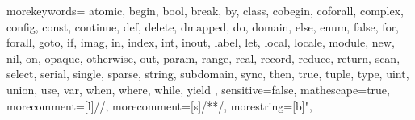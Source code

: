   {
    morekeywords={
      atomic,
      begin, bool, break, by,
      class, cobegin, coforall, complex, config, const, continue,
      def, delete, dmapped, do, domain,
      else, enum,
      false, for, forall,
      goto,
      if, imag, in, index, int, inout,
      label, let, local, locale,
      module,
      new, nil,
      on, opaque, otherwise, out,
      param,
      range, real, record, reduce, return,
      scan, select, serial, single, sparse, string, subdomain, sync,
      then, true, tuple, type,
      uint, union, use,
      var,
      when, where, while,
      yield
    },
    sensitive=false,
    mathescape=true,
    morecomment=[l]{//},
    morecomment=[s]{/*}{*/},
    morestring=[b]",
}

\lstset{
    basicstyle=\footnotesize\ttfamily,
    keywordstyle=\bfseries,
    commentstyle=\em,
    showstringspaces=false,
    flexiblecolumns=false,
    language=chapel,
  }

\newcommand{\chpl}[1]{\lstinline[language=chapel,basicstyle=\small\ttfamily,keywordstyle=]!#1!}


\newcommand{\cc}[1]{\lstinline[language=c++,basicstyle=\small\ttfamily,keywordstyle=]!#1!}

